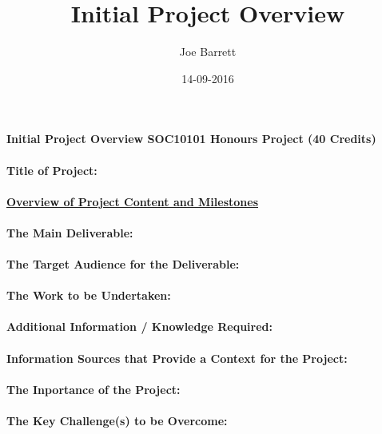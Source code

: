 \documentclass{article}
\title{Initial Project Overview}
\date{14-09-2016}
\author{Joe Barrett}
\begin{document}
	\setcounter{secnumdepth}{-1}
	\paragraph{\Large Initial Project Overview
			\newline
			SOC10101 Honours Project (40 Credits)
	}
	\paragraph{Title of Project:}
	\paragraph{\bf \underline{Overview of Project Content and Milestones}}
	\paragraph{The Main Deliverable:}
	\paragraph{The Target Audience for the Deliverable:}
	\paragraph{The Work to be Undertaken:}
	\paragraph{Additional Information / Knowledge Required:}
	\paragraph{Information Sources that Provide a Context for the Project:}
	\paragraph{The Inportance of the Project:}
	\paragraph{The Key Challenge(s) to be Overcome:}
\end{document}

